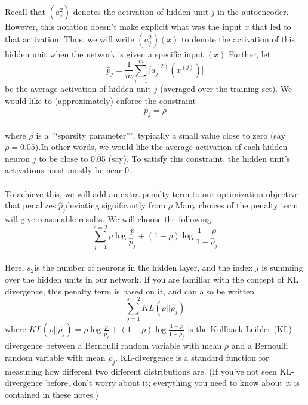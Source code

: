 \documentclass[conference]{IEEEtran}
\begin{document}
\paragraph{}
Recall that $(a_j^2)$ denotes the activation of hidden unit ${j}$
in the autoencoder. However, this notation doesn’t 
make explicit what was the input $x$ that led to that activation. Thus, we will write
$(a_j^2)(x)$ to denote the activation of this hidden unit when the network is given a specific input $(x)$
Further, let\\
\begin{equation}
    \hat{p}_j = \frac{1}{m}\sum_{i=1}^m \bigg [ a_j^{(2)}(x^{(j)}) \bigg ]
     \end{equation}
be the average activation of hidden unit $j$ (averaged over the training set). We would like to (approximately) enforce the constraint
\begin{equation}
\hat{p}_j = \rho 
     \end{equation}
\paragraph{}
where $\rho$ is a ”‘sparsity parameter”’, typically a small value close to zero 
(say $\rho = \bm{0.05}$).In other words, we would like the average activation of each hidden neuron $j$
to be close to 0.05 (say). To satisfy this constraint, the hidden unit’s activations must mostly be near 0.
\paragraph{}
To achieve this, we will add an extra penalty term to our optimization objective that penalizes
$\hat{p}_j$deviating significantly from $\rho$ Many choices of the penalty term will give reasonable results. 
We will choose the following:
\begin{equation}
    \sum_{j=1}^{s=2}\rho \log\frac{p}{\hat{p}_j} + (1 - \rho)\log\frac{1 - \rho}{1 - \hat{\rho}_j}    
    \end{equation}

\paragraph{}
Here, $s_2$is the number of neurons in the hidden layer, and the index $j$
is summing over the hidden units in our network. If you are familiar with the concept of KL divergence, 
this penalty term is based on it, and can also be written
\begin{equation}
    \sum_{j=1}^{s=2}KL(\rho || \hat{\rho}_j)
    \end{equation}
where $KL(\rho || \hat{\rho}_j) = \rho \log\frac{p}{\hat{p}_j} + (1 - \rho)\log\frac{1 - \rho}{1 - \hat{\rho}_j}$
is the Kullback-Leibler (KL) divergence between a Bernoulli random variable with mean $\rho$
and a Bernoulli random variable with mean $\hat{\rho}_j$. KL-divergence is a standard function for measuring how different two different distributions are. (If you’ve not seen KL-divergence before, don’t worry about it; everything 
you need to know about it is contained in these notes.)
\end{document}
